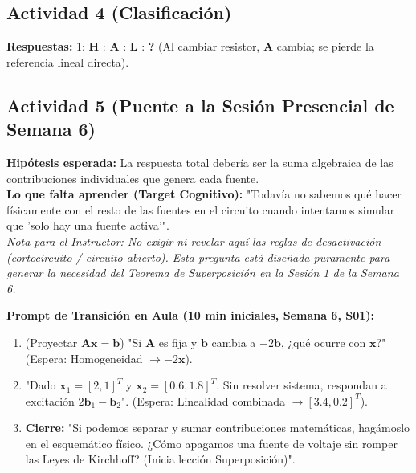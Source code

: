 \documentclass[11pt, a4paper]{article}
\begin{document}
\subsection*{Actividad 4 (Clasificación)}
\textbf{Respuestas:} 
1: \textbf{H} : \textbf{A} : \textbf{L} : \textbf{?} (Al cambiar resistor, $\bm{A}$ cambia; se pierde la referencia lineal directa).

\subsection*{Actividad 5 (Puente a la Sesión Presencial de Semana 6)}
\textbf{Hipótesis esperada:} La respuesta total debería ser la suma algebraica de las contribuciones individuales que genera cada fuente. \\
\textbf{Lo que falta aprender (Target Cognitivo):} "Todavía no sabemos qué hacer físicamente con el resto de las fuentes en el circuito cuando intentamos simular que 'solo hay una fuente activa'". \\
\textit{Nota para el Instructor: No exigir ni revelar aquí las reglas de desactivación (cortocircuito / circuito abierto). Esta pregunta está diseñada puramente para generar la necesidad del Teorema de Superposición en la Sesión 1 de la Semana 6.}

\vspace{0.5cm}
\begin{tcolorbox}[colback=white, colframe=black, boxrule=0.5pt, arc=1mm]
\textbf{Prompt de Transición en Aula (10 min iniciales, Semana 6, S01):}
\begin{enumerate}
    \item (Proyectar $\bm{A}\bm{x} = \bm{b}$) "Si $\bm{A}$ es fija y $\bm{b}$ cambia a $-2\bm{b}$, ¿qué ocurre con $\bm{x}$?" (Espera: Homogeneidad $\rightarrow -2\bm{x}$).
    \item "Dado $\bm{x}_1=[2,1]^T$ y $\bm{x}_2=[0.6,1.8]^T$. Sin resolver sistema, respondan a excitación $2\bm{b}_1 - \bm{b}_2$". (Espera: Linealidad combinada $\rightarrow [3.4, 0.2]^T$).
    \item \textbf{Cierre:} "Si podemos separar y sumar contribuciones matemáticas, hagámoslo en el esquemático físico. ¿Cómo apagamos una fuente de voltaje sin romper las Leyes de Kirchhoff? (Inicia lección Superposición)".
\end{enumerate}
\end{tcolorbox}
\end{document}
